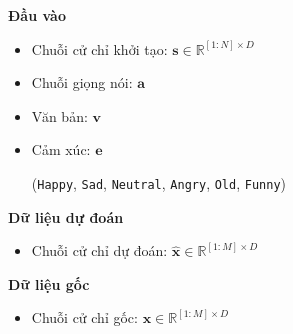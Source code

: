 \begin{multicols}{2}
	
\textbf{Đầu vào}

\begin{itemize}
	\item Chuỗi cử chỉ khởi tạo: $\mathbf{s} \in \mathbb{R}^{[1:N] \times D}$
	\item Chuỗi giọng nói: $\mathbf{a}$
	\item Văn bản: $\mathbf{v}$ 
	\item Cảm xúc: $\mathbf{e}$ 
	
	{\small
		(\texttt{Happy},  \texttt{Sad},  \texttt{Neutral}, \texttt{Angry}, \texttt{Old}, \texttt{Funny})
	}
\end{itemize}

\columnbreak

\textbf{Dữ liệu dự đoán}
\vspace{-10pt}
\begin{itemize}
	\item Chuỗi cử chỉ dự đoán: $\hat{\mathbf{x}} \in \mathbb{R}^{[1:M] \times D}$
\end{itemize}

\textbf{Dữ liệu gốc}
\vspace{-10pt}
\begin{itemize}
	\item Chuỗi cử chỉ gốc: $ \mathbf{x}  \in \mathbb{R}^{[1:M] \times D}$
\end{itemize}

\end{multicols}






